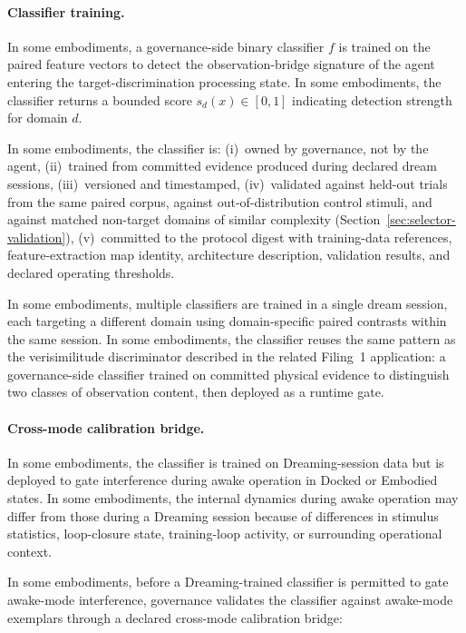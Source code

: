 \documentclass[a4paper,12pt]{article}
\begin{document}
\paragraph{Classifier training.}
In some embodiments, a governance-side binary classifier $f$ is
trained on the paired feature vectors to detect the observation-bridge
signature of the agent entering the target-discrimination processing
state. In some embodiments, the classifier returns a bounded score
$s_d(x) \in [0,1]$ indicating detection strength for domain $d$.

In some embodiments, the classifier is:
(i)~owned by governance, not by the agent,
(ii)~trained from committed evidence produced during declared dream
sessions,
(iii)~versioned and timestamped,
(iv)~validated against held-out trials from the same paired corpus,
against out-of-distribution control stimuli, and against matched
non-target domains of similar complexity
(Section~\ref{sec:selector-validation}),
(v)~committed to the protocol digest with training-data references,
feature-extraction map identity, architecture description, validation
results, and declared operating thresholds.

In some embodiments, multiple classifiers are trained in a single
dream session, each targeting a different domain using
domain-specific paired contrasts within the same session. In some
embodiments, the classifier reuses the same pattern as the
verisimilitude discriminator described in the related Filing~1
application: a governance-side classifier trained on committed physical
evidence to distinguish two classes of observation content, then
deployed as a runtime gate.

\paragraph{Cross-mode calibration bridge.}
\label{sec:cross-mode-qualification-bridge}
In some embodiments, the classifier is trained on Dreaming-session
data but is deployed to gate interference during awake operation in
Docked or Embodied states. In some embodiments, the internal dynamics
during awake operation may differ from those during a Dreaming session
because of differences in stimulus statistics, loop-closure state,
training-loop activity, or surrounding operational context.

In some embodiments, before a Dreaming-trained classifier is permitted
to gate awake-mode interference, governance validates the classifier
against awake-mode exemplars through a declared cross-mode calibration
bridge:
\end{document}
